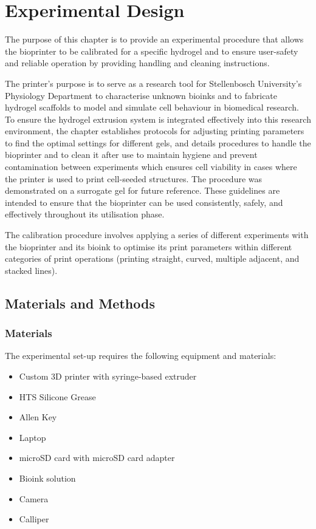 \chapter{Experimental Design}
The purpose of this chapter is to provide an experimental procedure that allows the bioprinter to be calibrated for a specific hydrogel and to ensure user-safety and reliable operation by providing handling and cleaning instructions. 

The printer's purpose is to serve as a research tool for Stellenbosch University’s Physiology Department to characterise unknown bioinks and to fabricate hydrogel scaffolds to model and simulate cell behaviour in biomedical research. To ensure the hydrogel extrusion system is integrated effectively into this research environment, the chapter establishes protocols for adjusting printing parameters to find the optimal settings for different gels, and details procedures to handle the bioprinter and to clean it after use to maintain hygiene and prevent contamination between experiments which ensures cell viability in cases where the printer is used to print cell-seeded structures. The procedure was demonstrated on a surrogate gel for future reference. These guidelines are intended to ensure that the bioprinter can be used consistently, safely, and effectively throughout its utilisation phase.

The calibration procedure involves applying a series of different experiments with the bioprinter and its bioink to optimise its print parameters within different categories of print operations (printing straight, curved, multiple adjacent, and stacked lines). 

\section{Materials and Methods}
\subsection{Materials}
The experimental set-up requires the following equipment and materials:
\begin{itemize}
\item Custom 3D printer with syringe-based extruder
\item HTS Silicone Grease
\item Allen Key
\item Laptop
\item microSD card with microSD card adapter
\item Bioink solution
\item Camera
\item Calliper
\end{itemize}

